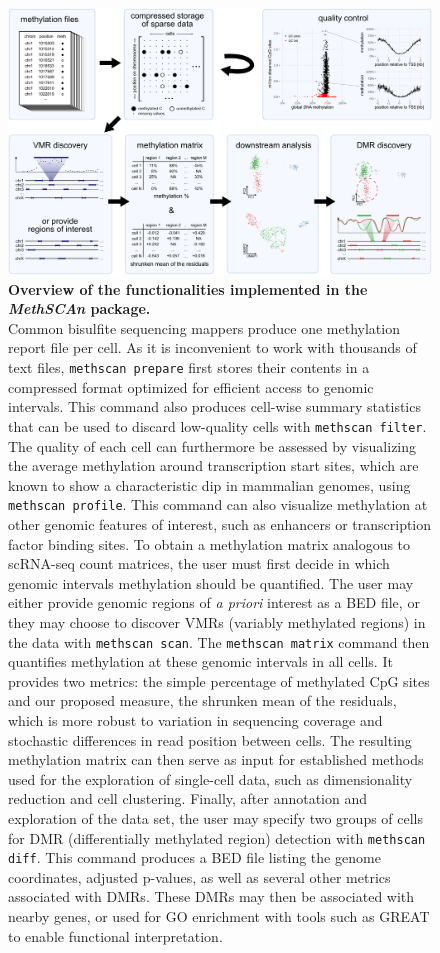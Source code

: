 \documentclass[10pt]{article}
\begin{document}
\begin{figure}[p]
	\begin{center}
		\includegraphics[width=.8\textwidth]{figures/Fig_workflow.pdf}
	\end{center}
	\caption{\small \textbf{Overview of the functionalities implemented in the \textit{MethSCAn} package.}\\
		Common bisulfite sequencing mappers produce one methylation report file per cell.
		As it is inconvenient to work with thousands of text files, \texttt{methscan prepare} first stores their contents in a compressed format optimized for efficient access to genomic intervals.
		This command also produces cell-wise summary statistics that can be used to discard low-quality cells with \texttt{methscan filter}.
		The quality of each cell can furthermore be assessed by visualizing the average methylation around transcription start sites, which are known to show a characteristic dip in mammalian genomes, using \texttt{methscan profile}.
		This command can also visualize methylation at other genomic features of interest, such as enhancers or transcription factor binding sites.
		To obtain a methylation matrix analogous to scRNA-seq count matrices, the user must first decide in which genomic intervals methylation should be quantified.
		The user may either provide genomic regions of \emph{a priori} interest as a BED file, or they may choose to discover VMRs (variably methylated regions) in the data with \texttt{methscan scan}.
		The \texttt{methscan matrix} command then quantifies methylation at these genomic intervals in all cells.
		It provides two metrics:
		the simple percentage of methylated CpG sites and our proposed measure, the shrunken mean of the residuals, which is more robust to variation in sequencing coverage and stochastic differences in read position between cells.
		The resulting methylation matrix can then serve as input for established methods used for the exploration of single-cell data, such as dimensionality reduction and cell clustering.
		Finally, after annotation and exploration of the data set, the user may specify two groups of cells for DMR (differentially methylated region) detection with \texttt{methscan diff}.
		This command produces a BED file listing the genome coordinates, adjusted p-values, as well as several other metrics associated with DMRs.
		These DMRs may then be associated with nearby genes, or used for GO enrichment with tools such as GREAT \citep{mclean2010great} to enable functional interpretation.
	}
	\label{fig:workflow}
\end{figure}
\end{document}
